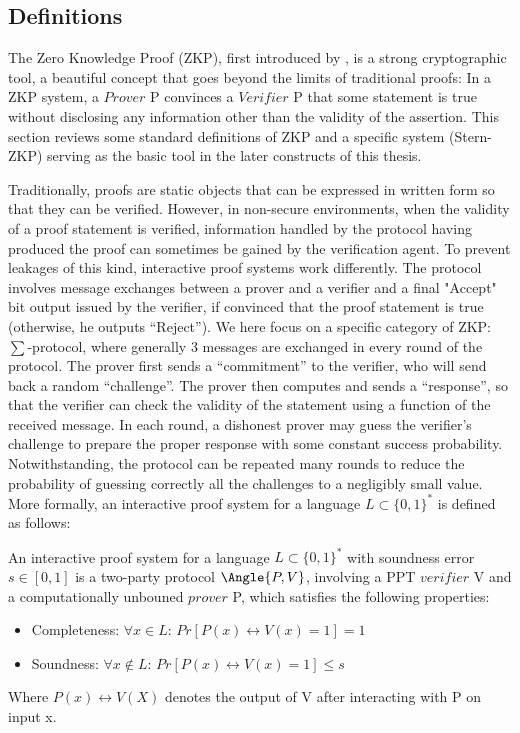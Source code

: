 \subsection{Definitions}
\label{sec:zkpdefinitions}
The Zero Knowledge Proof (ZKP), first introduced by \cite{goldwasser1989knowledge},
is a strong cryptographic tool, a beautiful concept that goes beyond the limits
of traditional proofs: In a ZKP system, a $Prover$ P convinces a $Verifier$ P
that some statement is true without disclosing any information other than the validity of the
assertion. This section reviews some standard definitions of ZKP and a specific
system (Stern-ZKP) serving as the basic tool in the later constructs of
this thesis.

Traditionally, proofs are static objects that can be expressed in written
form so that they can be verified. However, in non-secure environments, when the
validity of a proof statement is verified, information handled by the protocol having produced the proof can sometimes be gained by the verification agent. To prevent leakages of this kind, interactive proof systems work differently. The protocol involves message exchanges between a prover and a verifier and a final "Accept" bit output issued by the verifier, if convinced that the proof statement is true (otherwise, he outputs ``Reject''). We here focus on a specific category of ZKP: \(\sum\)-protocol, where generally 3 messages are exchanged in every round of the protocol. The prover first
sends a ``commitment'' to the verifier, who will send back a random
``challenge''. The prover then computes and sends a ``response'', so that the
verifier can check the validity of the statement using a function of the received
message. In each round, a dishonest prover may guess the verifier's
challenge to prepare the proper response with some constant success
probability. Notwithstanding, the protocol can be repeated many rounds to reduce the
probability of guessing correctly all the challenges to a negligibly small value.  More
formally, an interactive proof system for a language \(L \subset \{0,1\}^{*}\)
is defined as follows:

\begin{definition}
   An interactive proof system for a language
  \(L \subset \{0,1\}^{*}\) with soundness error \(s \in [0,1]\) is a two-party
  protocol \(\Angle{P,V}\), involving a PPT \(verifier \) V and a computationally
  unbouned \(prover \) P, which satisfies the following properties:
  \begin{itemize}
  \item Completeness: \(\forall x \in L\): \(Pr[P(x) \leftrightarrow V(x) = 1] = 1\)
  \item Soundness: \(\forall x \notin L\): \(Pr[P(x) \leftrightarrow V(x) = 1] \leq s\)
  \end{itemize}
\end{definition}
Where \(P(x) \leftrightarrow V(X)\) denotes the output of V after interacting
with P on input x.

